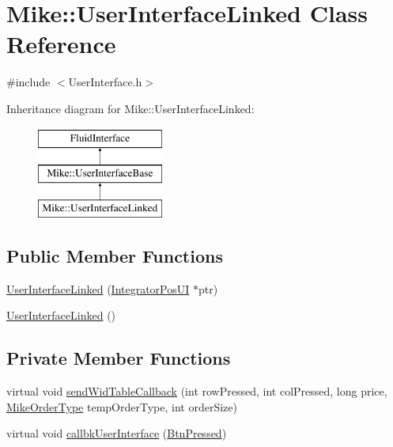 \hypertarget{class_mike_1_1_user_interface_linked}{}\section{Mike\+:\+:User\+Interface\+Linked Class Reference}
\label{class_mike_1_1_user_interface_linked}


{\ttfamily \#include $<$User\+Interface.\+h$>$}

Inheritance diagram for Mike\+:\+:User\+Interface\+Linked\+:\begin{figure}[H]
\begin{center}
\leavevmode
\includegraphics[height=3.000000cm]{class_mike_1_1_user_interface_linked}
\end{center}
\end{figure}
\subsection*{Public Member Functions}
\begin{DoxyCompactItemize}
\item 
\hyperlink{class_mike_1_1_user_interface_linked_aa740cbba693f1b5bb18e9415fb986a05}{User\+Interface\+Linked} (\hyperlink{class_mike_1_1_user_interface_linked_aa68f3dbce9d9f381bea2f56fda8bfb6b}{Integrator\+Pos\+UI} $\ast$ptr)
\item 
\hyperlink{class_mike_1_1_user_interface_linked_a6bae08d2fe4a3270f2bb42458d843327}{User\+Interface\+Linked} ()
\end{DoxyCompactItemize}
\subsection*{Private Member Functions}
\begin{DoxyCompactItemize}
\item 
virtual void \hyperlink{class_mike_1_1_user_interface_linked_a687ab0f108f97cae19ee81688a45476a}{send\+Wid\+Table\+Callback} (int row\+Pressed, int col\+Pressed, long price, \hyperlink{namespace_mike_aa486aea8b1d0d07190982a311394e6cb}{Mike\+Order\+Type} temp\+Order\+Type, int order\+Size)
\item 
virtual void \hyperlink{class_mike_1_1_user_interface_linked_a3ad33941e45f2f171cb4db443cb46841}{callbk\+User\+Interface} (\hyperlink{namespace_mike_a9dd611fa3c671b02e477e6b21465cc66}{Btn\+Pressed})
\end{DoxyCompactItemize}
